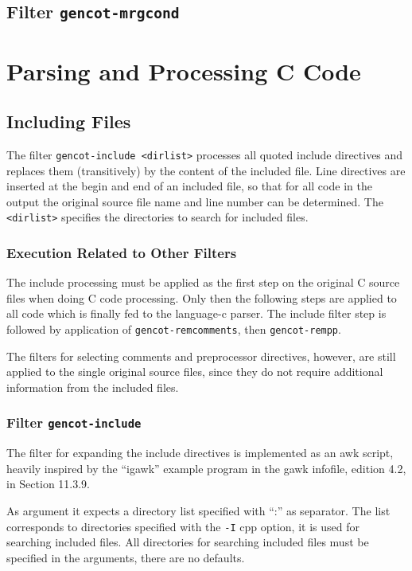 \documentclass[a4paper]{report}
\newcommand{\code}[1]{\textnormal{\texttt{#1}}}
\begin{document}
\subsection{Filter \code{gencot-mrgcond}}

\section{Parsing and Processing C Code}

\subsection{Including Files}

The filter \code{gencot-include <dirlist>} processes all quoted include directives and replaces them (transitively) by the 
content of the included file. Line directives are inserted at the begin and end of an included file, so that
for all code in the output the original source file name and line number can be determined. The \code{<dirlist>}
specifies the directories to search for included files.

\subsubsection{Execution Related to Other Filters}

The include processing must be applied as the first step on the original C source files when doing C code processing.
Only then the following steps are applied to all code which is finally fed to the language-c parser. The
include filter step is followed by application of \code{gencot-remcomments}, then \code{gencot-rempp}.

The filters for selecting comments and preprocessor directives, however, are still applied to the single
original source files, since they do not require additional information from the included files.

\subsubsection{Filter \code{gencot-include}}

The filter for expanding the include directives is implemented as an awk script, heavily inspired by the ``igawk''
example program in the gawk infofile, edition 4.2, in Section 11.3.9.

As argument it expects a directory list specified with ``:'' as separator. The list corresponds
to directories specified with the \code{-I} cpp option, it is used for searching included files.
All directories for searching included files must be specified in the arguments, there are no defaults.
\end{document}
